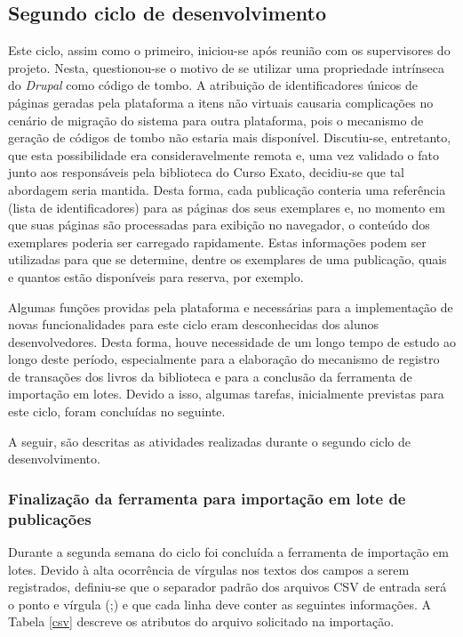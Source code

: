 \documentclass[a4paper]{article}
\begin{document}
\pagebreak
\subsection{Segundo ciclo de desenvolvimento}
Este ciclo, assim como o primeiro, iniciou-se após reunião com os supervisores do projeto. Nesta, questionou-se o motivo de se utilizar uma propriedade intrínseca do \textit{Drupal} como código de tombo. A atribuição de identificadores únicos de páginas geradas pela plataforma a itens não virtuais causaria complicações no cenário de migração do sistema para outra plataforma, pois o mecanismo de geração de códigos de tombo não estaria mais disponível. Discutiu-se, entretanto, que esta possibilidade era consideravelmente remota e, uma vez validado o fato junto aos responsáveis pela biblioteca do Curso Exato, decidiu-se que tal abordagem seria mantida. Desta forma, cada publicação conteria uma referência (lista de identificadores) para as páginas dos seus exemplares e, no momento em que suas páginas são processadas para exibição no navegador, o conteúdo dos exemplares poderia ser carregado rapidamente. Estas informações podem ser utilizadas para que se determine, dentre os exemplares de uma publicação, quais e quantos estão disponíveis para reserva, por exemplo.

Algumas funções providas pela plataforma e necessárias para a implementação de novas funcionalidades para este ciclo eram desconhecidas dos alunos desenvolvedores. Desta forma, houve necessidade de um longo tempo de estudo ao longo deste período, especialmente para a elaboração do mecanismo de registro de transações dos livros da biblioteca e para a conclusão da ferramenta de importação em lotes. Devido a isso, algumas tarefas, inicialmente previstas para este ciclo, foram concluídas no seguinte.

A seguir, são descritas as atividades realizadas durante o segundo ciclo de desenvolvimento.


\subsubsection{Finalização da ferramenta para importação em lote de publicações}

Durante a segunda semana do ciclo foi concluída a ferramenta de importação em lotes. Devido à alta ocorrência de vírgulas nos textos dos campos a serem registrados, definiu-se que o separador padrão dos arquivos CSV de entrada será o ponto e vírgula (;) e que cada linha deve conter as seguintes informações. A Tabela \ref{csv} descreve os atributos do arquivo solicitado na importação.
\end{document}
